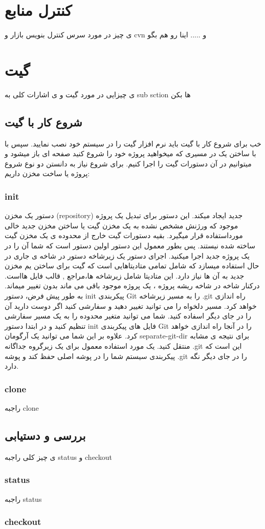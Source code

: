 \section{کنترل منابع }
ی چیز در مورد سرس کنترل بنویس بازار و cvn و ..... اینا رو هم بگو 



\section{گیت }
ی چیزایی در مورد گیت و ی اشارات کلی به sub sction ها بکن 
\subsection{شروع کار با گیت}
خب برای شروع کار با گیت باید نرم افزار گیت را در سیستم خود نصب نمایید.
سپس با با ساختن یک  در مسیری که میخواهید پروژه خود را شروع کنید صفحه ای باز میشود و میتوانیم در آن دستورات گیت را اجرا کنیم. برای شروع نیاز به دانستن دو نوع شروع پروژه یا ساخت مخزن داریم:
\subsubsection{init}
دستور  یک مخزن (repository) جدید ایجاد میکند. این دستور برای تبدیل یک پروژه موجود که ورژنش مشخص نشده به یک مخزن گیت یا ساختن   مخزن جدید خالی مورداستفاده قرار میگیرد. \newline
بقیه دستورات گیت خارج از محدوده ی یک مخزن گیت ساخته شده نیستند. پس بطور معمول این دستور اولین دستور است که شما آن را در یک پروژه جدید اجرا میکنید. \newline
اجرای دستور  یک زیرشاخه دستور  در شاخه ی جاری در حال استفاده میسازد که شامل تمامی متادیتاهایی است که گیت برای ساختن یم مخزن جدید به آن ها نیاز دارد. این متادیتا شامل زیرشاخه ها،مراجع , قالب فایل هااست. \newline
درکنار شاخه  در شاخه ریشه پروژه ، یک پروژه موجود باقی می ماند بدون تغییر میماند.  \newline
به طور پیش فرض، دستور init پیکربندی Git را به مسیر زیرشاخه .git راه اندازی خواهد کرد. مسیر دلخواه را می توانید تغییر دهید و سفارشی کنید اگر دوست دارید آن را در جای دیگر اسفاده کنید. شما می توانید متغیر محدوده   را به یک مسیر سفارشی تنظیم کنید و در ابتدا دستور init فایل های پیکربندی Git را در آنجا راه اندازی خواهد کرد. علاوه بر این شما می توانید یک آرگومان separate-git-dir برای نتیجه ی مشابه منتقل کنید. یک مورد استفاده معمول برای یک زیرگروه جداگانه .git این است که پیکربندی سیستم شما را در پوشه اصلی حفظ کند و پوشه .git را در جای دیگر نگه دارد.\newline
\subsubsection{clone}
راجبه clone
\subsection{بررسی و دستیابی}
ی چیز کلی راجبه status و checkout 
\subsubsection{status}
راجبه status 
\subsubsection{checkout}